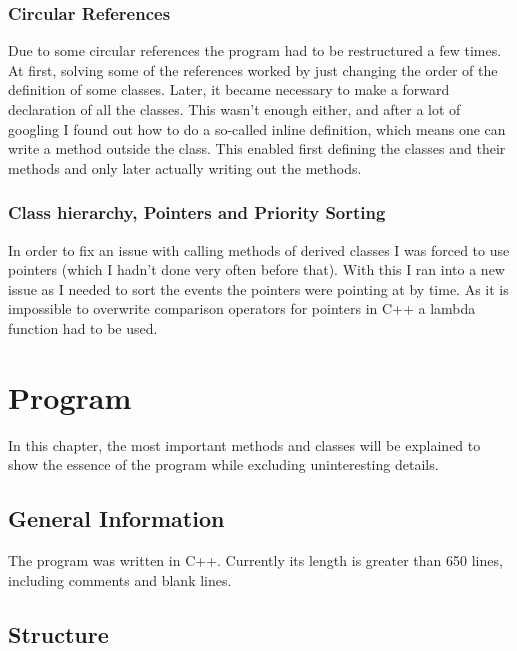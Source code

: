 \documentclass[10pt]{report}
\begin{document}
\subsection{Circular References}
Due to some circular references the program had to be restructured a few times. At first, solving some of the references worked by just changing the order of the definition of some classes. Later, it became necessary to make a forward declaration of all the classes. This wasn't enough either, and after a lot of googling I found out how to do a so-called inline definition, which means one can write a method outside the class. This enabled first defining the classes and their methods and only later actually writing out the methods.

\subsection{Class hierarchy, Pointers and Priority Sorting}
In order to fix an issue with calling methods of derived classes I was forced to use pointers (which I hadn't done very often before that). With this I ran into a new issue as I needed to sort the events the pointers were pointing at by time. As it is impossible to overwrite comparison operators for pointers in C++ a lambda function had to be used. 

\chapter{Program}

In this chapter, the most important methods and classes will be explained to show the essence of the program while excluding uninteresting details.

\section{General Information}
The program was written in C++. Currently its length is greater than 650 lines, including comments and blank lines. 

\section{Structure}
\end{document}
